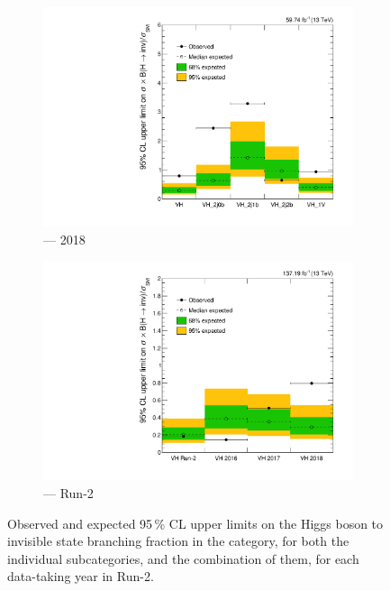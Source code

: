 \begin{figure}[htbp]
    \begin{subfigure}[b]{0.45\textwidth}
        \includegraphics[width=\textwidth]{figures/limits/VH/limit_2018_VH.pdf}
        \caption{\VH --- 2018}
    \end{subfigure}
    \hfill
    \begin{subfigure}[b]{0.45\textwidth}
        \includegraphics[width=\textwidth]{figures/limits/VH/limit_Run2_VH.pdf}
        \caption{\VH --- Run-2}
    \end{subfigure}
    \caption[Observed and expected 95\,\% CL upper limits on the Higgs boson to invisible state branching fraction in the \VH category, for both the individual subcategories, and the combination of them, for each data-taking year in Run-2]{Observed and expected 95\,\% CL upper limits on the Higgs boson to invisible state branching fraction in the \VH category, for both the individual subcategories, and the combination of them, for each data-taking year in Run-2.}
    \label{fig:htoinv_limit_VH}
\end{figure}

